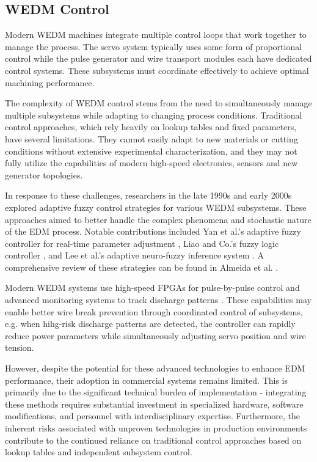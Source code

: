 \documentclass[11pt]{article}
\begin{document}
\subsection{WEDM Control}

Modern WEDM machines integrate multiple control loops that work together to manage the process. The servo system typically uses some form of proportional control while the pulse generator and wire transport modules each have dedicated control systems. These subsystems must coordinate effectively to achieve optimal machining performance.

The complexity of WEDM control stems from the need to simultaneously manage multiple subsystems while adapting to changing process conditions. Traditional control approaches, which rely heavily on lookup tables and fixed parameters, have several limitations. They cannot easily adapt to new materials or cutting conditions without extensive experimental characterization, and they may not fully utilize the capabilities of modern high-speed electronics, sensors and new generator topologies.

In response to these challenges, researchers in the late 1990s and early 2000s explored adaptive fuzzy control strategies for various WEDM subsystems. These approaches aimed to better handle the complex phenomena and stochastic nature of the EDM process. Notable contributions included Yan et al.'s adaptive fuzzy controller for real-time parameter adjustment \cite{yan1998adaptive}, Liao and Co.'s fuzzy logic controller \cite{liao2000design}, and Lee et al.'s adaptive neuro-fuzzy inference system \cite{lee2007adaptive}. A comprehensive review of these strategies can be found in Almeida et al. \cite{almeida2022servo}.

Modern WEDM systems use high-speed FPGAs for pulse-by-pulse control and advanced monitoring systems to track discharge patterns \cite{SparkTrack}. These capabilities may enable better wire break prevention through coordinated control of subsystems, e.g. when hihg-risk discharge patterns are detected, the controller can rapidly reduce power parameters while simultaneously adjusting servo position and wire tension.

However, despite the potential for these advanced technologies to enhance EDM performance, their adoption in commercial systems remains limited. This is primarily due to the significant technical burden of implementation - integrating these methods requires substantial investment in specialized hardware, software modifications, and personnel with interdisciplinary expertise. Furthermore, the inherent risks associated with unproven technologies in production environments contribute to the continued reliance on traditional control approaches based on lookup tables and independent subsystem control.
\end{document}
